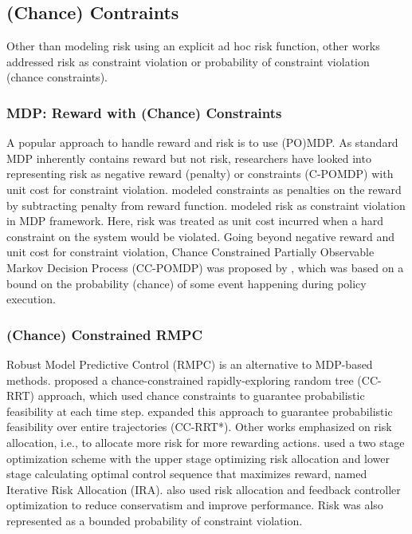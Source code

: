 \documentclass[letterpaper]{article} %
\begin{document}
\subsection{(Chance) Contraints}
Other than modeling risk using an explicit ad hoc risk function, other works addressed risk as constraint violation or probability of constraint violation (chance constraints). 

\subsubsection{MDP: Reward with (Chance) Constraints}
A popular approach to handle reward and risk is to use (PO)MDP. As standard MDP inherently contains reward but not risk, researchers have looked into representing risk as negative reward (penalty) or constraints (C-POMDP) with unit cost for constraint violation. \citeauthor{pereira2013risk} modeled constraints as penalties on the reward by subtracting penalty from reward function. \citeauthor{undurti2010online} modeled risk as constraint violation in MDP framework. Here, risk was treated as unit cost incurred when a hard constraint on the system would be violated. Going beyond negative reward and unit cost for constraint violation, Chance Constrained Partially Observable Markov Decision Process (CC-POMDP) was proposed by \citeauthor{santana2016rao}, which was based on a bound on the probability (chance) of some event happening during policy execution. 

\subsubsection{(Chance) Constrained RMPC}
Robust Model Predictive Control (RMPC) is an alternative to MDP-based methods. \citeauthor{luders2010chance} proposed a chance-constrained rapidly-exploring random tree (CC-RRT) approach, which used chance constraints to guarantee probabilistic feasibility at each time step. \citeauthor{luders2013robust} expanded this approach to guarantee probabilistic feasibility over entire trajectories (CC-RRT*). Other works emphasized on risk allocation, i.e., to allocate more risk for more rewarding actions. \citeauthor{ono2008iterative}  used a two stage optimization scheme with the upper stage optimizing risk allocation and lower stage calculating optimal control sequence that maximizes reward, named Iterative Risk Allocation (IRA). \citeauthor{vitus2011feedback} also used risk allocation and feedback controller optimization to reduce conservatism and improve performance. Risk was also represented as a bounded probability of constraint violation. 
\end{document}
